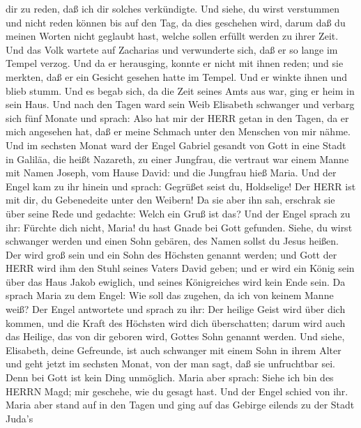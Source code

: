 dir zu reden, daß ich dir solches verkündigte.  Und siehe,
du wirst verstummen und nicht reden können bis auf den Tag, da dies
geschehen wird, darum daß du meinen Worten nicht geglaubt hast, welche
sollen erfüllt werden zu ihrer Zeit.  Und das Volk wartete
auf Zacharias und verwunderte sich, daß er so lange im Tempel verzog.
 Und da er herausging, konnte er nicht mit ihnen reden; und
sie merkten, daß er ein Gesicht gesehen hatte im Tempel. Und er winkte
ihnen und blieb stumm.  Und es begab sich, da die Zeit
seines Amts aus war, ging er heim in sein Haus.  Und nach
den Tagen ward sein Weib Elisabeth schwanger und verbarg sich fünf
Monate und sprach:  Also hat mir der HERR getan in den
Tagen, da er mich angesehen hat, daß er meine Schmach unter den Menschen
von mir nähme.  Und im sechsten Monat ward der Engel
Gabriel gesandt von Gott in eine Stadt in Galiläa, die heißt Nazareth,
 zu einer Jungfrau, die vertraut war einem Manne mit Namen
Joseph, vom Hause David: und die Jungfrau hieß Maria.  Und
der Engel kam zu ihr hinein und sprach: Gegrüßet seist du, Holdselige!
Der HERR ist mit dir, du Gebenedeite unter den Weibern!  Da
sie aber ihn sah, erschrak sie über seine Rede und gedachte: Welch ein
Gruß ist das?  Und der Engel sprach zu ihr: Fürchte dich
nicht, Maria! du hast Gnade bei Gott gefunden.  Siehe, du
wirst schwanger werden und einen Sohn gebären, des Namen sollst du Jesus
heißen.  Der wird groß sein und ein Sohn des Höchsten
genannt werden; und Gott der HERR wird ihm den Stuhl seines Vaters David
geben;  und er wird ein König sein über das Haus Jakob
ewiglich, und seines Königreiches wird kein Ende sein.  Da
sprach Maria zu dem Engel: Wie soll das zugehen, da ich von keinem Manne
weiß?  Der Engel antwortete und sprach zu ihr: Der heilige
Geist wird über dich kommen, und die Kraft des Höchsten wird dich
überschatten; darum wird auch das Heilige, das von dir geboren wird,
Gottes Sohn genannt werden.  Und siehe, Elisabeth, deine
Gefreunde, ist auch schwanger mit einem Sohn in ihrem Alter und geht
jetzt im sechsten Monat, von der man sagt, daß sie unfruchtbar sei.
 Denn bei Gott ist kein Ding unmöglich.  Maria
aber sprach: Siehe ich bin des HERRN Magd; mir geschehe, wie du gesagt
hast. Und der Engel schied von ihr.  Maria aber stand auf
in den Tagen und ging auf das Gebirge eilends zu der Stadt Juda's
